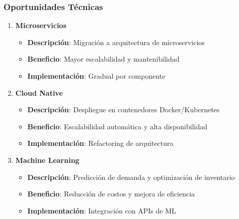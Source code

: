 \documentclass[12pt,a4paper]{article}
\begin{document}
\subsubsection{Oportunidades Técnicas}
\begin{enumerate}
    \item \textbf{Microservicios}
    \begin{itemize}
        \item \textbf{Descripción}: Migración a arquitectura de microservicios
        \item \textbf{Beneficio}: Mayor escalabilidad y mantenibilidad
        \item \textbf{Implementación}: Gradual por componente
    \end{itemize}
    
    \item \textbf{Cloud Native}
    \begin{itemize}
        \item \textbf{Descripción}: Despliegue en contenedores Docker/Kubernetes
        \item \textbf{Beneficio}: Escalabilidad automática y alta disponibilidad
        \item \textbf{Implementación}: Refactoring de arquitectura
    \end{itemize}
    
    \item \textbf{Machine Learning}
    \begin{itemize}
        \item \textbf{Descripción}: Predicción de demanda y optimización de inventario
        \item \textbf{Beneficio}: Reducción de costos y mejora de eficiencia
        \item \textbf{Implementación}: Integración con APIs de ML
    \end{itemize}
\end{enumerate}
\end{document}
